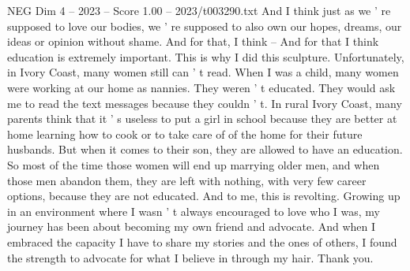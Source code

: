 \begin{textsample}{NEG Dim 4 – 2023 – Score 1.00 – 2023/t003290.txt}
And I think just as we ' re supposed to love our bodies, we ' re supposed to also own our hopes, dreams, our ideas or opinion without shame.
And for that, I think -- And for that I think education is extremely important.
This is why I did this sculpture.
Unfortunately, in Ivory Coast, many women still can ' t read.
When I was a child, many women were working at our home as nannies.
They weren ' t educated.
They would ask me to read the text messages because they couldn ' t.
In rural Ivory Coast, many parents think that it ' s useless to put a girl in school because they are better at home learning how to cook or to take care of of the home for their future husbands.
But when it comes to their son, they are allowed to have an education.
So most of the time those women will end up marrying older men, and when those men abandon them, they are left with nothing, with very few career options, because they are not educated.
And to me, this is revolting.
Growing up in an environment where I wasn ' t always encouraged to love who I was, my journey has been about becoming my own friend and advocate.
And when I embraced the capacity I have to share my stories and the ones of others, I found the strength to advocate for what I believe in through my hair.
Thank you.

\end{textsample}
